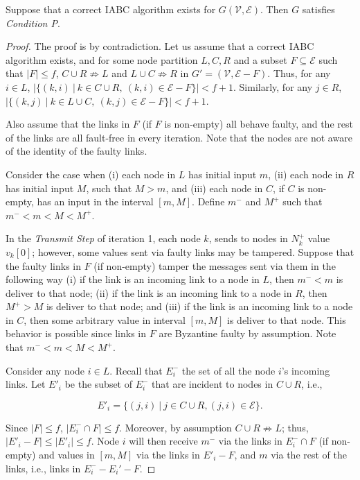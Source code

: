 \documentclass{llncs}
\newcommand{\scripte}{\mathcal{E}}
\newcommand{\scriptv}{\mathcal{V}}
\begin{document}
\begin{theorem}
\label{thm:nc}
Suppose that a correct IABC algorithm exists for $G(\scriptv, \scripte)$. Then $G$ satisfies {\em Condition P}.
\end{theorem}
\begin{proof}



The proof is by contradiction.
Let us assume that a correct IABC algorithm exists,
and for some node partition $L, C, R$ and a subset $F \subseteq \scripte$ such that $|F| \leq f$, $C\cup R\not\Rightarrow L$ and $L\cup C\not\Rightarrow R$ in $G'=(\scriptv, \scripte-F)$.
Thus, for any $i\in L$, $|\{(k,i)~|~k\in C\cup R,~(k,i) \in \scripte-F\}|<f+1$. Similarly,
for any  $j\in R$, $|\{(k,j)~|~k\in L\cup C,~(k,j) \in \scripte-F\}|<f+1$.



Also assume that the links in $F$ (if $F$ is non-empty) all behave faulty, and the rest of the links are all fault-free in every iteration. Note that the nodes are not aware of the identity of the faulty links.

Consider the case when (i) each node in $L$ has initial input $m$, (ii) each
node in $R$ has initial input $M$, such that $M>m$,
and (iii) each node in $C$, if $C$ is non-empty,
has an input in the interval $[m,M]$. Define $m^-$ and $M^+$ such that $m^- <m<M<M^+$.

In the {\em Transmit Step} of iteration 1, each node $k$, sends to nodes in $N_k^+$ value $v_k[0]$; however, some values sent via faulty links may be tampered. Suppose that the faulty links in $F$ (if non-empty) tamper the messages sent via them in the following way (i) if the link is an incoming link to a node in $L$, then $m^- < m$ is deliver to that node;
(ii) if the link is an incoming link to a node in $R$, then $M^+ > M$ is deliver to that node; and (iii) if the link is an incoming link to a node in $C$, then some arbitrary value in interval $[m,M]$ is deliver to that node. This behavior is possible since links in $F$ are Byzantine faulty by assumption. Note that $m^-<m<M<M^+$. 

Consider any node $i \in L$. Recall that $E_i^-$ the set of all the node $i$'s incoming links. Let $E'_i$ be the subset of $E_i^-$ that are incident to nodes in $C\cup R$, i.e., 

\[
E'_i = \{(j, i)~|~j \in C\cup R, (j,i)\in\scripte\}.
\]

Since $|F|\leq f$, $|E_i^-\cap F|\leq f$.
Moreover, by assumption $C\cup R\not\Rightarrow L$; thus, $|E'_i - F| \leq |E'_i|\le f$.
Node $i$ will then receive $m^-$ via the links in $E_i^-\cap F$ (if non-empty)
and values in $[m,M]$ via the links in $E'_i - F$, and
$m$ via the rest of the links, i.e., links in $E_i^- - E_i' - F$.


\end{proof}
\end{document}
